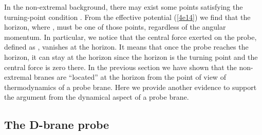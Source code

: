 \documentclass[a4paper,12pt]{article}
\begin{document}
In the non-extremal background, there may exist some points satisfying
the turning-point condition \coordHE{}. From the effective potential
(\ref{4e14}) we find that the horizon, where \coordHE{}, must be one
of those points, regardless of the angular momentum. In particular,
we notice that the central force exerted on the probe, defined as
\coordHE{}, vanishes at the horizon. It means that once
the probe reaches the horizon, it can stay at the horizon since the horizon
is the turning point and the central force is zero there. In the previous
section we have shown that the non-extremal branes are ``located''
at the horizon from the point of view of thermodynamics of a probe brane.
Here we provide another evidence to support the argument from the dynamical
aspect of a probe brane.


\subsection{The D\coordHE{}-brane probe}
\end{document}
